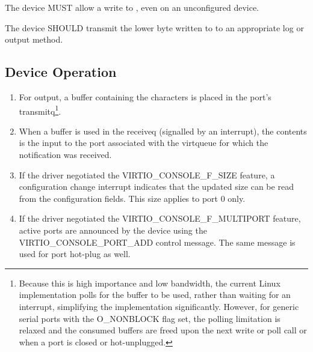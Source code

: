 
The device MUST allow a write to , even on an
unconfigured device.

The device SHOULD transmit the lower byte written to  to
an appropriate log or output method.

\subsection{Device Operation}\label{sec:Device Types / Console Device / Device Operation}

\begin{enumerate}
\item For output, a buffer containing the characters is placed in
  the port's transmitq\footnote{Because this is high importance and low bandwidth, the current
Linux implementation polls for the buffer to be used, rather than
waiting for an interrupt, simplifying the implementation
significantly. However, for generic serial ports with the
O_NONBLOCK flag set, the polling limitation is relaxed and the
consumed buffers are freed upon the next write or poll call or
when a port is closed or hot-unplugged.
}.

\item When a buffer is used in the receiveq (signalled by an
  interrupt), the contents is the input to the port associated
  with the virtqueue for which the notification was received.

\item If the driver negotiated the VIRTIO_CONSOLE_F_SIZE feature, a
  configuration change interrupt indicates that the updated size can
  be read from the configuration fields.  This size applies to port 0 only.

\item If the driver negotiated the VIRTIO_CONSOLE_F_MULTIPORT
  feature, active ports are announced by the device using the
  VIRTIO_CONSOLE_PORT_ADD control message. The same message is
  used for port hot-plug as well.
\end{enumerate}


